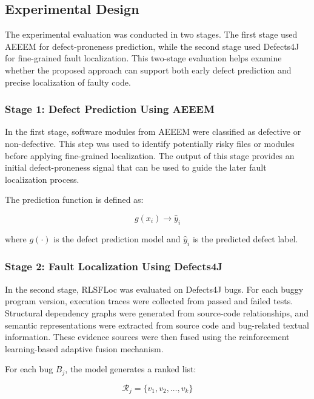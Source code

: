 \documentclass[article,article,submit,pdftex,moreauthors]{Definitions/mdpi}
\begin{document}
\subsection{Experimental Design}

The experimental evaluation was conducted in two stages. The first stage used AEEEM for defect-proneness prediction, while the second stage used Defects4J for fine-grained fault localization. This two-stage evaluation helps examine whether the proposed approach can support both early defect prediction and precise localization of faulty code.

\subsubsection{Stage 1: Defect Prediction Using AEEEM}

In the first stage, software modules from AEEEM were classified as defective or non-defective. This step was used to identify potentially risky files or modules before applying fine-grained localization. The output of this stage provides an initial defect-proneness signal that can be used to guide the later fault localization process.

The prediction function is defined as:

\begin{equation}
g(x_i) \rightarrow \hat{y}_i
\end{equation}

where $g(\cdot)$ is the defect prediction model and $\hat{y}_i$ is the predicted defect label.

\subsubsection{Stage 2: Fault Localization Using Defects4J}

In the second stage, RLSFLoc was evaluated on Defects4J bugs. For each buggy program version, execution traces were collected from passed and failed tests. Structural dependency graphs were generated from source-code relationships, and semantic representations were extracted from source code and bug-related textual information. These evidence sources were then fused using the reinforcement learning-based adaptive fusion mechanism.

For each bug $B_j$, the model generates a ranked list:

\begin{equation}
\mathcal{R}_j = \{v_1, v_2, \ldots, v_k\}
\end{equation}
\end{document}
